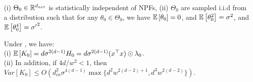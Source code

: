 \begin{assumption}\label{assmp:main}
(i) $\Theta_0\in\mathbb{R}^{d_{net}}$ is statistically independent of NPFs, (ii) $\Theta_0$ are sampled i.i.d from a distribution such that for any $\theta_0\in\Theta_0$,  we have $\mathbb{E}\left[\theta_0\right]=0$, and  $\mathbb{E}\left[\theta^2_0\right]=\sigma^2$, and $\mathbb{E}\left[\theta^4_0\right]={\sigma'}^2$.
\end{assumption}
\begin{theorem}\label{th:main} Under , we have:\\
(i) $\mathbb{E}\left[K_0\right]=d\sigma^{2(d-1)} H_0=d\sigma^{2(d-1)} (x^\top x)\odot \lambda_0$.\\
(ii) In addition, if ${4d}/{w^2}<1$, then $Var\left[K_0\right]\leq O\left(d^2_{in}\sigma^{4(d-1)}\max\{d^2w^{2(d-2)+1}, d^3w^{2(d-2)}\}\right)$.
\end{theorem}


